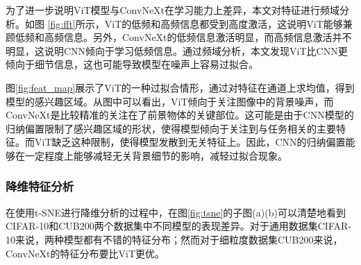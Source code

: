 为了进一步说明ViT模型与ConvNeXt在学习能力上差异，本文对特征进行频域分析。如图
\ref{fig:fft}所示，ViT的低频和高频信息都受到高度激活，这说明ViT能够兼顾低频和高频信息。另外，ConvNeXt的低频信息激活明显，而高频信息激活并不明显，这说明CNN倾向于学习低频信息。通过频域分析，本文发现ViT比CNN更倾向于细节信息，这也可能导致模型在噪声上容易过拟合。

图\ref{fig:feat_map}展示了ViT的一种过拟合情形，通过对特征在通道上求均值，得到模型的感兴趣区域。从图中可以看出，ViT倾向于关注图像中的背景噪声，而ConvNeXt是比较精准的关注在了前景物体的关键部位。这可能是由于CNN模型的归纳偏置限制了感兴趣区域的形状，使得模型倾向于关注到与任务相关的主要特征。而ViT缺乏这种限制，使得模型发散到无关特征上。因此，CNN的归纳偏置能够在一定程度上能够减轻无关背景细节的影响，减轻过拟合现象。

\subsubsection{降维特征分析}

在使用t-SNE进行降维分析的过程中，在图\ref{fig:tsne}的子图(a)(b)可以清楚地看到CIFAR-10和CUB200两个数据集中不同模型的表现差异。对于通用数据集CIFAR-10来说，两种模型都有不错的特征分布；然而对于细粒度数据集CUB200来说，ConvNeXt的特征分布要比ViT更优。

